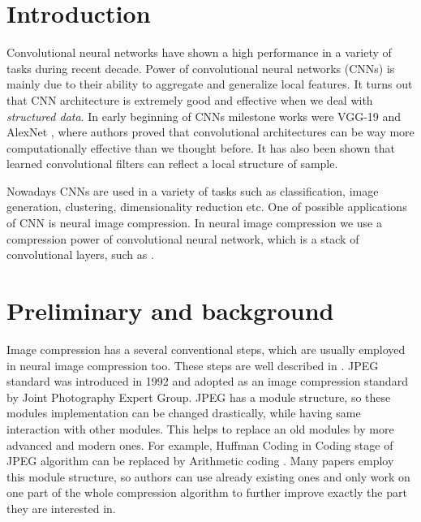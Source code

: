 \chapter{Introduction}

Convolutional neural networks have shown a high performance in a variety of tasks during recent decade. Power of convolutional neural networks (CNNs) is mainly due to their ability to aggregate and generalize local features. It turns out that CNN architecture is extremely good and effective when we deal with \textit{structured data}. In early beginning of CNNs milestone works were VGG-19 \cite{Simonyan_Zisserman_2015} and AlexNet \cite{Krizhevsky_Sutskever_Hinton_2017}, where authors proved that convolutional architectures can be way more computationally effective than we thought before. It has also been shown that learned convolutional filters can reflect a local structure of sample.

Nowadays CNNs are used in a variety of tasks such as classification,  image generation, clustering, dimensionality reduction etc. One of possible applications of CNN is neural image compression. In neural image compression we use a compression power of convolutional neural network, which is a stack of convolutional layers, such as \cite{Krizhevsky_Sutskever_Hinton_2017}.

\chapter{Preliminary and background}

Image compression has a several conventional steps, which are usually employed in neural image compression too. These steps are well described in \cite{JPEG-1992}. JPEG standard was introduced in 1992 and adopted as an image compression standard by Joint Photography Expert Group. JPEG has a module structure, so these modules implementation can be changed drastically, while having same interaction with other modules. This helps to replace an old modules by more advanced and modern ones. For example, Huffman Coding \cite{Huffman-Coding} in Coding stage of JPEG algorithm can be replaced by Arithmetic coding \cite{Arithmetic-Coding}. Many papers employ this module structure, so authors can use already existing ones and only work on one part of the whole compression algorithm to further improve exactly the part they are interested in.

